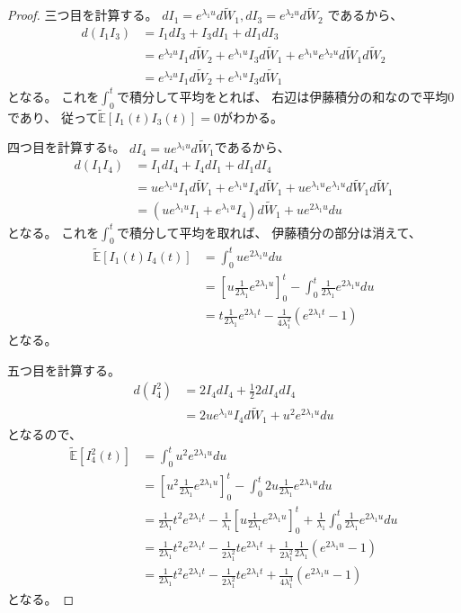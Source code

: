 \documentclass[uplatex]{jsarticle}
\theoremstyle{definition}
\def\E{\mathbb{E}}
\begin{document}
\begin{proof}
  三つ目を計算する。
  \(dI_1 = e^{\lambda_1u}d\tilde{W}_1,
  dI_3 = e^{\lambda_2u}d\tilde{W}_2\)
  であるから、
  \begin{align*}
    d\left(I_1I_3\right)
    &= I_1dI_3 + I_3dI_1 + dI_1dI_3 \\
    &= e^{\lambda_2u}I_1d\tilde{W}_2 + e^{\lambda_1u}I_3d\tilde{W}_1
    + e^{\lambda_1u}e^{\lambda_2u}d\tilde{W}_1d\tilde{W}_2 \\
    &= e^{\lambda_2u}I_1d\tilde{W}_2 + e^{\lambda_1u}I_3d\tilde{W}_1
  \end{align*}
  となる。
  これを\(\int_0^t\)で積分して平均をとれば、
  右辺は伊藤積分の和なので平均\(0\)であり、
  従って\(\tilde{\E}[I_1(t)I_3(t)] = 0\)がわかる。

  四つ目を計算するt。
  \(dI_4 = ue^{\lambda_1u}d\tilde{W}_1\)であるから、
  \begin{align*}
    d(I_1I_4)
    &= I_1dI_4+I_4dI_1+dI_1dI_4 \\
    &= ue^{\lambda_1u}I_1d\tilde{W}_1
    + e^{\lambda_1u}I_4d\tilde{W}_1
    + ue^{\lambda_1u}e^{\lambda_1u}d\tilde{W}_1d\tilde{W}_1 \\
    &= \left( ue^{\lambda_1u}I_1 + e^{\lambda_1u}I_4\right)d\tilde{W}_1
    + ue^{2\lambda_1u}du
  \end{align*}
  となる。
  これを\(\int_0^t\)で積分して平均を取れば、
  伊藤積分の部分は消えて、
  \begin{align*}
    \tilde{\E}[I_1(t)I_4(t)]
    &= \int_0^tue^{2\lambda_1u}du \\
    &= \left[ u\frac{1}{2\lambda_1}e^{2\lambda_1u}\right]_0^t
    - \int_0^t\frac{1}{2\lambda_1}e^{2\lambda_1u}du \\
    &= t\frac{1}{2\lambda_1}e^{2\lambda_1t}
    - \frac{1}{4\lambda_1^2}\left( e^{2\lambda_1t}-1 \right)
  \end{align*}
  となる。

  五つ目を計算する。
  \begin{align*}
    d(I_4^2)
    &= 2I_4dI_4 + \frac{1}{2}2dI_4dI_4 \\
    &= 2ue^{\lambda_1u}I_4d\tilde{W}_1
    + u^2e^{2\lambda_1u}du
  \end{align*}
  となるので、
  \begin{align*}
    \tilde{\E}[I_4^2(t)]
    &= \int_0^tu^2e^{2\lambda_1u}du \\
    &= \left[ u^2\frac{1}{2\lambda_1}e^{2\lambda_1u}\right]_0^t
    - \int_0^t2u\frac{1}{2\lambda_1}e^{2\lambda_1u}du \\
    &= \frac{1}{2\lambda_1}t^2e^{2\lambda_1t}
    - \frac{1}{\lambda_1}\left[
    u\frac{1}{2\lambda_1}e^{2\lambda_1u}\right]_0^t
    + \frac{1}{\lambda_1}\int_0^t\frac{1}{2\lambda_1}e^{2\lambda_1u}du \\
    &= \frac{1}{2\lambda_1}t^2e^{2\lambda_1t}
    - \frac{1}{2\lambda_1^2}te^{2\lambda_1t}
    + \frac{1}{2\lambda_1^2}\frac{1}{2\lambda_1}
    \left( e^{2\lambda_1u}-1 \right) \\
    &= \frac{1}{2\lambda_1}t^2e^{2\lambda_1t}
    - \frac{1}{2\lambda_1^2}te^{2\lambda_1t}
    + \frac{1}{4\lambda_1^3}\left( e^{2\lambda_1u}-1 \right)
  \end{align*}
  となる。


\end{proof}
\end{document}

